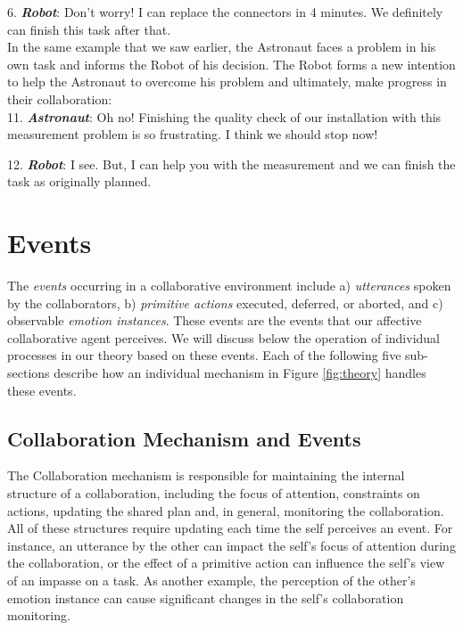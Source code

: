 \documentclass[12pt]{report}
\begin{document}
  6. \textbf{\textit{Robot}}: Don't worry! I can replace the connectors in 4
  minutes. We definitely can finish this task after that.\\
  
In the same example that we saw earlier, the Astronaut faces a problem in his
own task and informs the Robot of his decision. The Robot forms a new intention
to help the Astronaut to overcome his problem and ultimately, make progress in
their collaboration:\\
 
  11. \textbf{\textit{Astronaut}}: Oh no! Finishing the quality check of our
  installation with this measurement problem is so frustrating. I think we
  should stop now!

  12. \textbf{\textit{Robot}}: I see. But, I can help you with the measurement  
  and we can finish the task as originally planned.

\section{Events}
\label{sec:events}

The \textit{events} occurring in a collaborative environment include a)
\textit{utterances} spoken by the collaborators, b) \textit{primitive actions}
executed, deferred, or aborted, and c) observable \textit{emotion instances}.
These events are the events that our affective collaborative agent perceives. We
will discuss below the operation of individual processes in our theory based on
these events. Each of the following five sub-sections describe how an individual
mechanism in Figure \ref{fig:theory} handles these events.

\subsection{Collaboration Mechanism and Events}

The Collaboration mechanism is responsible for maintaining the internal
structure of a collaboration, including the focus of attention, constraints on
actions, updating the shared plan and, in general, monitoring the collaboration.
All of these structures require updating each time the self perceives an event.
For instance, an utterance by the other can impact the self's focus of attention
during the collaboration, or the effect of a primitive action can influence the
self's view of an impasse on a task. As another example, the perception of the
other's emotion instance can cause significant changes in the self's
collaboration monitoring.
\end{document}
